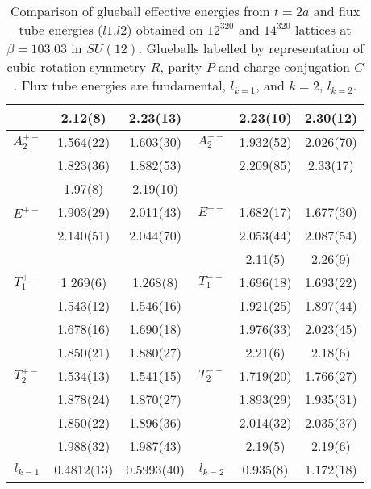 \documentclass[12pt]{article}
\begin{document}
\begin{table}[htb]
\begin{tabular}{|c|c|c||c|c|c|}
          & 2.12(8)   & 2.23(13)   &            & 2.23(10) & 2.30(12)  \\ \hline
$A_2^{+-}$  & 1.564(22)  & 1.603(30)  & $A_2^{--}$ & 1.932(52) & 2.026(70)  \\
          & 1.823(36)  & 1.882(53)  &          & 2.209(85)  & 2.33(17)  \\
          & 1.97(8)    & 2.19(10)   &          &            &   \\ \hline
$E^{+-}$   & 1.903(29) & 2.011(43)  & $E^{--}$ & 1.682(17) & 1.677(30)  \\
          & 2.140(51) & 2.044(70)  &          & 2.053(44) & 2.087(54)  \\
          &           &            &          & 2.11(5)   & 2.26(9)   \\ \hline
$T_1^{+-}$  & 1.269(6)  & 1.268(8)  & $T_1^{--}$ & 1.696(18)  & 1.693(22)  \\ 
          & 1.543(12)  & 1.546(16)  &          & 1.921(25)  & 1.897(44)  \\
          & 1.678(16)  & 1.690(18)  &          & 1.976(33)  & 2.023(45)  \\
          & 1.850(21)  & 1.880(27)  &          & 2.21(6)    & 2.18(6) \\ \hline
$T_2^{+-}$  & 1.534(13)  & 1.541(15) & $T_2^{--}$ & 1.719(20) & 1.766(27)  \\
          & 1.878(24)  & 1.870(27)  &          & 1.893(29)  & 1.935(31)  \\
          & 1.850(22)  & 1.896(36)  &          & 2.014(32)  & 2.035(37)  \\
          & 1.988(32)  & 1.987(43)  &          & 2.19(5)    & 2.19(6)  \\ \hline \hline
$l_{k=1}$  & 0.4812(13) & 0.5993(40) &  $l_{k=2}$ & 0.935(8)   & 1.172(18)  \\ \hline
\end{tabular}
\caption{Comparison of glueball effective energies from $t=2a$  and flux tube energies ($l1$,$l2$)
  obtained on $12^320$ and $14^320$ lattices at $\beta=103.03$ in $SU(12)$. 
  Glueballs labelled by representation of cubic rotation symmetry $R$, parity $P$ and charge
  conjugation $C$. Flux tube energies are fundamental, $l_{k=1}$, and $k=2$, $l_{k=2}$.}
\label{table_GvsV_SU12}
\end{table}
\end{document}
